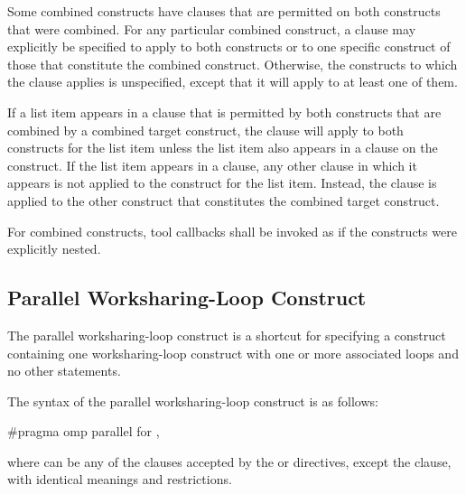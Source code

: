 Some combined constructs have clauses that are permitted on both 
constructs that were combined. For any particular combined construct, a clause
may explicitly be specified to apply to both constructs or to one specific
construct of those that constitute the combined construct.  Otherwise, the
constructs to which the clause applies is unspecified, except that it will
apply to at least one of them.

If a list item appears in a clause that is permitted by both constructs that
are combined by a combined target construct, the clause will apply to both
constructs for the list item unless the list item also appears in a 
clause on the construct. If the list item appears in a  clause, any
other clause in which it appears is not applied to the  construct
for the list item. Instead, the clause is applied to the other construct that
constitutes the combined target construct.

For combined constructs, tool callbacks shall be invoked as if the constructs were
explicitly nested.






\subsection{Parallel Worksharing-Loop Construct}
\label{subsec:Parallel Worksharing-Loop Construct}
\summary
The parallel worksharing-loop construct is a shortcut for specifying a  construct
containing one worksharing-loop construct with one or more associated loops and no other statements.


\syntax
\begin{ccppspecific}
The syntax of the parallel worksharing-loop construct is as follows:

\begin{ompcPragma}
#pragma omp parallel for \plc{[clause[ [},\plc{] clause] ... ] new-line}
\end{ompcPragma}

where  can be any of the clauses accepted by the  or  directives,
except the  clause, with identical meanings and restrictions.
\end{ccppspecific}

